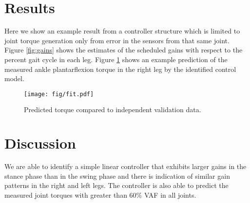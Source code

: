 \documentclass[10pt,letterpaper,notitlepage,twocolumn]{article}
\begin{document}
\section*{Results}
%
Here we show an example result from a controller structure which is limited to
joint torque generation only from error in the sensors from that same joint.
Figure \ref{fig:gains} shows the estimates of the scheduled gains with respect
to the percent gait cycle in each leg. Figure \ref{fig:fit} shows an example
prediction of the measured ankle plantarflexion torque in the right leg by the
identified control model.
%
\begin{figure}[b]
  \begin{center}
    \texttt{[image: fig/fit.pdf]}
    \caption{Predicted torque compared to independent validation data.}
    \label{fig:fit}
  \end{center}
\end{figure}
%
\section*{Discussion}
%
We are able to identify a simple linear controller that exhibits larger gains
in the stance phase than in the swing phase and there is indication of similar
gain patterns in the right and left legs. The controller is also able to
predict the measured joint torques with greater than 60\% VAF in all joints.
%
%
\end{document}
